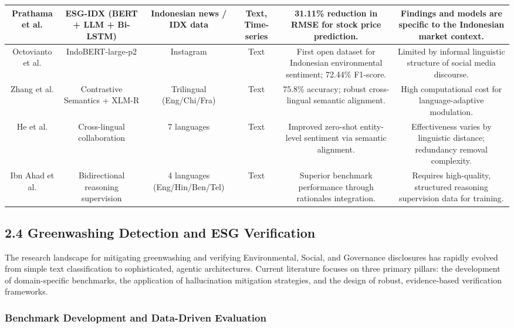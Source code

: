 \documentclass{article}
\begin{document}
\begin{table}[h!]
\begin{tabular}{|c|c|c|c|c|c|}
Prathama et al.  \parencite{ubaidillah_ariq_prathama_a1856e2f} & ESG-IDX (BERT + LLM + Bi-LSTM) & Indonesian news / IDX data & Text, Time-series & 31.11\% reduction in RMSE for stock price prediction. & Findings and models are specific to the Indonesian market context. \\ \hline
Octovianto et al.  \parencite{christofer_octovianto_487e90aa} & IndoBERT-large-p2 & Instagram & Text & First open dataset for Indonesian environmental sentiment; 72.44\% F1-score. & Limited by informal linguistic structure of social media discourse. \\ \hline
Zhang et al.  \parencite{liman_zhang_ec332205} & Contrastive Semantics + XLM-R & Trilingual (Eng/Chi/Fra) & Text & 75.8\% accuracy; robust cross-lingual semantic alignment. & High computational cost for language-adaptive modulation. \\ \hline
He et al.  \parencite{association_for_computational_linguistics_2025_5a25f994} & Cross-lingual collaboration & 7 languages & Text & Improved zero-shot entity-level sentiment via semantic alignment. & Effectiveness varies by linguistic distance; redundancy removal complexity. \\ \hline
Ibn Ahad et al.  \parencite{association_for_computational_linguistics_2025_1ba46dee} & Bidirectional reasoning supervision & 4 languages (Eng/Hin/Ben/Tel) & Text & Superior benchmark performance through rationales integration. & Requires high-quality, structured reasoning supervision data for training. \\ \hline
\end{tabular}
\end{table}
\subsection{2.4 Greenwashing Detection and ESG Verification}

The research landscape for mitigating greenwashing and verifying Environmental, Social, and Governance disclosures has rapidly evolved from simple text classification to sophisticated, agentic architectures. Current literature focuses on three primary pillars: the development of domain-specific benchmarks, the application of hallucination mitigation strategies, and the design of robust, evidence-based verification frameworks.
\subsubsection{Benchmark Development and Data-Driven Evaluation}
\end{document}

